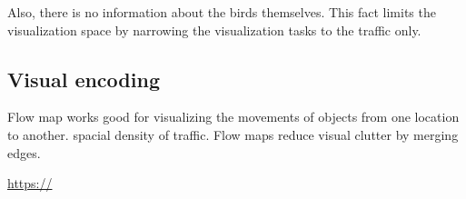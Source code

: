 \documentclass{article}
\begin{document}
Also, there is no information about the birds themselves. This fact limits the visualization space by narrowing the visualization tasks to the traffic only.

\subsection{Visual encoding}
Flow map works good for visualizing the movements of objects from one location to another. spacial density of traffic. Flow maps reduce visual clutter by merging edges. 



\begin{thebibliography}{9}

\url{https://}

\end{thebibliography}
\end{document}
